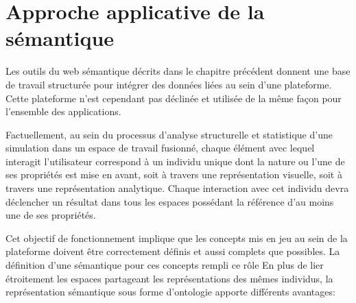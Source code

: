 \section{Approche applicative de la sémantique}




Les outils du web sémantique décrits dans le chapitre précédent donnent une base de travail structurée pour intégrer des données liées au sein d'une plateforme. Cette plateforme n'est cependant pas déclinée et utilisée de la même façon pour l'ensemble des applications.

Factuellement, au sein du processus d'analyse structurelle et statistique d'une simulation dans un espace de travail fusionné, chaque élément avec lequel interagit l'utilisateur correspond à un individu unique dont la nature ou l'une de ses propriétés est mise en avant, soit à travers une représentation visuelle, soit à travers une représentation analytique. Chaque interaction avec cet individu devra déclencher un résultat dans tous les espaces possédant la référence d'au moins une de ses propriétés.

Cet objectif de fonctionnement implique que les concepts mis en jeu au sein de la plateforme doivent être correctement définis et aussi complets que possibles. La définition d'une sémantique pour ces concepts rempli ce rôle
En plus de lier étroitement les espaces partageant les représentations des mêmes individus, la représentation sémantique sous forme d'ontologie apporte différents avantages:

